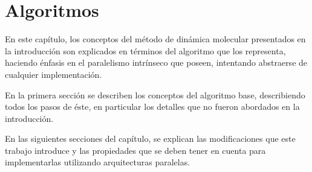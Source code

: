 
\chapter{Algoritmos}


En este capítulo, los conceptos del m\'etodo de dinámica molecular presentados en la introducción son explicados en términos del algoritmo que los representa,
haciendo énfasis en el paralelismo intrínseco que poseen, intentando abstraerse de cualquier implementación.

En la primera sección se describen los conceptos del algoritmo base, describiendo todos los pasos de éste, en particular los detalles que no fueron abordados en la introducción. 

En las siguientes secciones del capítulo, se explican las modificaciones que este trabajo introduce y las propiedades que se deben tener en cuenta para implementarlas utilizando arquitecturas paralelas.







